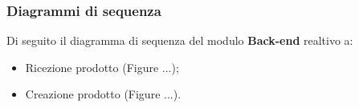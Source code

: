 \subsubsection{Diagrammi di sequenza}
Di seguito il diagramma di sequenza del modulo \textbf{Back-end} realtivo a:
\begin{itemize}
	\item Ricezione prodotto (Figure ...);
	\item Creazione prodotto (Figure ...).
\end{itemize}